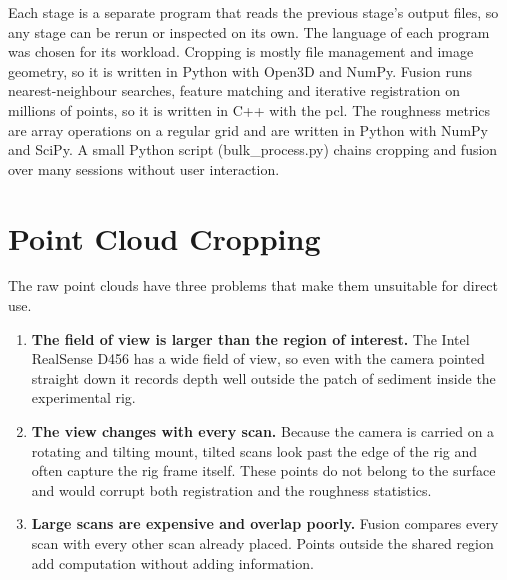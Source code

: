 Each stage is a separate program that reads the previous stage's output files, so any stage can be rerun or inspected on its own. The language of each program was chosen for its workload. Cropping is mostly file management and image geometry, so it is written in Python with Open3D and NumPy. Fusion runs nearest-neighbour searches, feature matching and iterative registration on millions of points, so it is written in C++ with the \gls{pcl}. The roughness metrics are array operations on a regular grid and are written in Python with NumPy and SciPy. A small Python script (bulk\_process.py) chains cropping and fusion over many sessions without user interaction.






\section{Point Cloud Cropping}
\label{sec:crop}




The raw point clouds have three problems that make them unsuitable for direct use.

\begin{enumerate}
	\item \textbf{The field of view is larger than the region of interest.} The Intel RealSense D456 has a wide field of view, so even with the camera pointed straight down it records depth well outside the patch of sediment inside the experimental rig.
	\item \textbf{The view changes with every scan.} Because the camera is carried on a rotating and tilting mount, tilted scans look past the edge of the rig and often capture the rig frame itself. These points do not belong to the surface and would corrupt both registration and the roughness statistics.
	\item \textbf{Large scans are expensive and overlap poorly.} Fusion compares every scan with every other scan already placed. Points outside the shared region add computation without adding information.
\end{enumerate}

